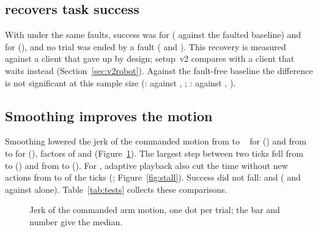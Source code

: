 \subsection{\drtc{} recovers task success}

With \drtc{} under the same faults, success was  for \smolvla{}
( against the faulted baseline) and  for \groot{}
(), and no trial was ended by a fault ( and
). This recovery is measured against a client that gave up by design; setup~v2 compares \drtc{}
with a client that waits instead (Section~\ref{sec:v2robot}). Against the fault-free baseline the difference is not significant at this sample size
(\smolvla:  against , ;
\groot:  against , ).

\subsection{Smoothing improves the motion}

Smoothing lowered the jerk of the commanded motion from  to ~\jerkunit{}
for \smolvla{} () and from  to  for
\groot{} (), factors of  and 
(Figure~\ref{fig:jerk}). The largest step between two ticks fell from  to
 () and from  to
 (). For \groot, adaptive playback also cut the time without
new actions from  to  of the ticks (;
Figure~\ref{fig:stall}). Success did not fall:  and 
( and  against \drtc{} alone).
Table~\ref{tab:tests} collects these comparisons.

\begin{figure}[htbp]
  \centering
  \caption{Jerk of the commanded arm motion, one dot per trial; the bar and number give the median.}
  \label{fig:jerk}
\end{figure}

